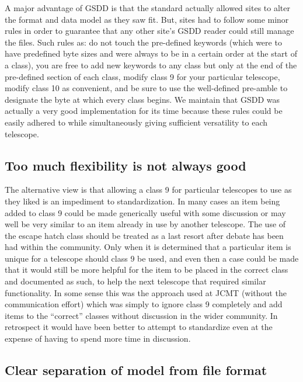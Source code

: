 \documentclass[final,authoryear,5p,times,twocolumn]{elsarticle}
\begin{document}
A major advantage of GSDD is that the standard actually allowed sites
to alter the format and data model as they saw fit.  But, sites had to
follow some minor rules in order to guarantee that any other site's
GSDD reader could still manage the files.  Such rules as: do not touch
the pre-defined keywords (which were to have predefined byte sizes and
were always to be in a certain order at the start of a class), you are
free to add new keywords to any class but only at the end of the
pre-defined section of each class, modify class 9 for your particular
telescope, modify class 10 as convenient, and be sure to
use the well-defined pre-amble to designate the byte at which every
class begins.  We maintain that GSDD was actually a very good
implementation for its time because these rules could be easily
adhered to while simultaneously giving sufficient versatility to each
telescope.

\subsection{Too much flexibility is not always good}

The alternative view is that allowing a class 9 for particular
telescopes to use as they liked is an impediment to
standardization. In many cases an item being added to class 9 could be
made generically useful with some discussion or may well be very
similar to an item already in use by another telescope. The use of the
escape hatch class should be treated as a last resort after debate has
been had within the community. Only when it is determined that a
particular item is unique for a telescope should class 9 be used, and
even then a case could be made that it would still be more helpful for
the item to be placed in the correct class and documented as such, to
help the next telescope that required similar functionality. In some
sense this was the approach used at JCMT (without the communication
effort) which was simply to ignore class 9 completely and add items to
the ``correct'' classes without discussion in the wider community. In
retrospect it would have been better to attempt to standardize even at
the expense of having to spend more time in discussion.

\subsection{Clear separation of model from file format}
\end{document}
